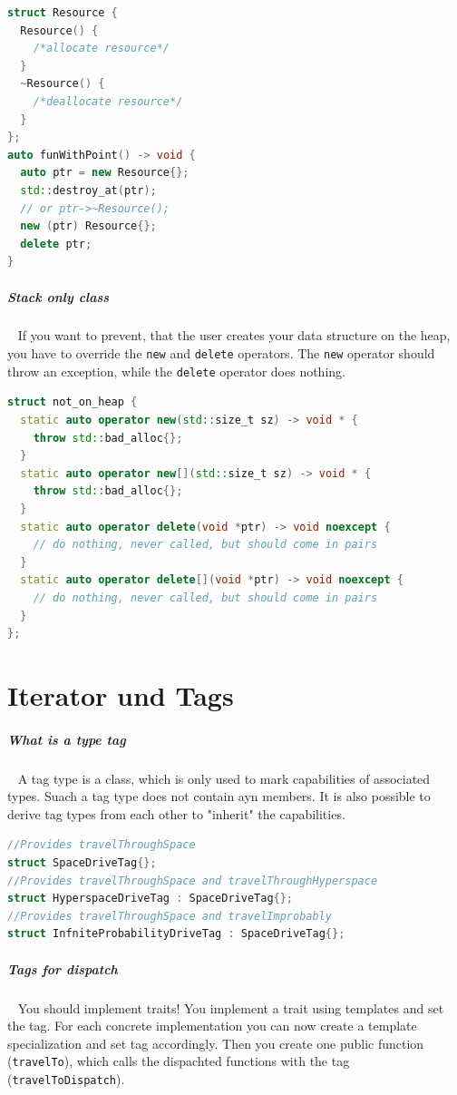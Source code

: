 \documentclass[11pt,twoside,landscape]{article}
\begin{document}
\begin{multicols}{2}
\begin{lstlisting}[language=c++,label=lst:org22f9af6,caption={Example for placement new and delete},captionpos=b,numbers=none]
struct Resource {
  Resource() {
    /*allocate resource*/
  }
  ~Resource() {
    /*deallocate resource*/
  }
};
auto funWithPoint() -> void {
  auto ptr = new Resource{};
  std::destroy_at(ptr);
  // or ptr->~Resource();
  new (ptr) Resource{};
  delete ptr;
}
\end{lstlisting}

\subparagraph{Stack only class} \
\label{sec:org886b45d}
If you want to prevent, that the user creates your data structure on the heap, you have to override the \texttt{new} and \texttt{delete} operators.
The \texttt{new} operator should throw an exception, while the \texttt{delete} operator does nothing.

\begin{lstlisting}[language=c++,label=lst:org4882595,caption={Example struct with overriden operators},captionpos=b,numbers=none]
struct not_on_heap {
  static auto operator new(std::size_t sz) -> void * {
    throw std::bad_alloc{};
  }
  static auto operator new[](std::size_t sz) -> void * {
    throw std::bad_alloc{};
  }
  static auto operator delete(void *ptr) -> void noexcept {
    // do nothing, never called, but should come in pairs
  }
  static auto operator delete[](void *ptr) -> void noexcept {
    // do nothing, never called, but should come in pairs
  }
};
\end{lstlisting}

\section{Iterator und Tags}
\label{sec:orgb762ff0}
\subparagraph{What is a type tag} \
\label{sec:orgf20483f}
A tag type is a class, which is only used to mark capabilities of associated types.
Suach a tag type does not contain ayn members.
It is also possible to derive tag types from each other to "inherit" the capabilities.


\begin{lstlisting}[language=c++,numbers=none]
//Provides travelThroughSpace
struct SpaceDriveTag{};
//Provides travelThroughSpace and travelThroughHyperspace
struct HyperspaceDriveTag : SpaceDriveTag{};
//Provides travelThroughSpace and travelImprobably
struct InfniteProbabilityDriveTag : SpaceDriveTag{};
\end{lstlisting}

\subparagraph{Tags for dispatch} \
\label{sec:org7bca053}
You should implement traits!
You implement a trait using templates and set the tag.
For each concrete implementation you can now create a template specialization and set tag accordingly.
Then you create one public function (\texttt{travelTo}), which calls the dispachted functions with the tag (\texttt{travelToDispatch}).


\end{multicols}
\end{document}
